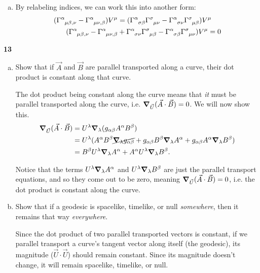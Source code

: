 \documentclass[gr-notes.tex]{subfiles}
\begin{document}
\begin{enumerate}[(a)]
\item By relabeling indices, we can work this into another form:
%
\begin{align*}
  (\tensor{\Gamma}{^\alpha_{\mu\beta,\nu}} -
   \tensor{\Gamma}{^\alpha_{\mu\nu,\beta}})
  V^\mu &=
  (\tensor{\Gamma}{^\alpha_{\sigma\beta}} \tensor{\Gamma}{^\sigma_{\mu\nu}} -
   \tensor{\Gamma}{^\alpha_{\sigma\nu}} \tensor{\Gamma}{^\sigma_{\mu\beta}})
  V^\mu
  \\
  (\tensor{\Gamma}{^\alpha_{\mu\beta,\nu}} -
   \tensor{\Gamma}{^\alpha_{\mu\nu,\beta}} &+
   \tensor{\Gamma}{^\alpha_{\sigma\nu}} \tensor{\Gamma}{^\sigma_{\mu\beta}} -
   \tensor{\Gamma}{^\alpha_{\sigma\beta}} \tensor{\Gamma}{^\sigma_{\mu\nu}})
  V^\mu =
  0
\end{align*}


\end{enumerate}




\textbf{13}
\begin{enumerate}[(a)]
\item Show that if $\vec{A}$ and $\vec{B}$ are parallel transported along a curve, their dot product is constant along that curve.

The dot product being constant along the curve means that \emph{it} must be parallel transported along the curve, i.e. $\grad_{\vec{U}} (\vec{A} \cdot \vec{B}) = 0$. We will now show this.
%
\begin{align*}
  \grad_{\vec{U}} (\vec{A} \cdot \vec{B}) &=
  U^\lambda \grad_\lambda (g_{\alpha\beta} A^\alpha B^\beta)
  \\ &=
  U^\lambda (
    A^\alpha B^\beta \cancel{\grad_\lambda g_{\alpha\beta}} +
    g_{\alpha\beta} B^\beta \grad_\lambda A^\alpha +
    g_{\alpha\beta} A^\alpha \grad_\lambda B^\beta
  )
  \\ &=
  B^\beta U^\lambda \grad_\lambda A^\alpha +
  A^\alpha U^\lambda \grad_\lambda B^\beta.
\end{align*}

Notice that the terms $U^\lambda \grad_\lambda A^\alpha$ and $U^\lambda \grad_\lambda B^\beta$ are just the parallel transport equations, and so they come out to be zero, meaning $\grad_{\vec{U}} (\vec{A} \cdot \vec{B}) = 0$, i.e. the dot product is constant along the curve.

\item Show that if a geodesic is spacelike, timelike, or null \emph{somewhere}, then it remains that way \emph{everywhere}.

Since the dot product of two parallel transported vectors is constant, if we parallel transport a curve's tangent vector along itself (the geodesic), its magnitude ($\vec{U} \cdot \vec{U}$) should remain constant. Since its magnitude doesn't change, it will remain spacelike, timelike, or null.

\end{enumerate}
\end{document}

